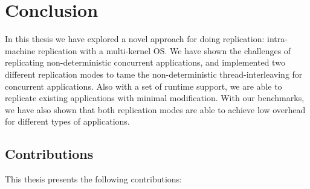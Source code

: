 \chapter{Conclusion}

In this thesis we have explored a novel approach for doing replication: intra-machine replication with a multi-kernel OS. We have shown the challenges of replicating non-deterministic concurrent applications, and implemented two different replication modes to tame the non-deterministic thread-interleaving for concurrent applications. Also with a set of runtime support, we are able to replicate existing applications with minimal modification. With our benchmarks, we have also shown that both replication modes are able to achieve low overhead for different types of  applications.

\section{Contributions}
This thesis presents the following contributions:

